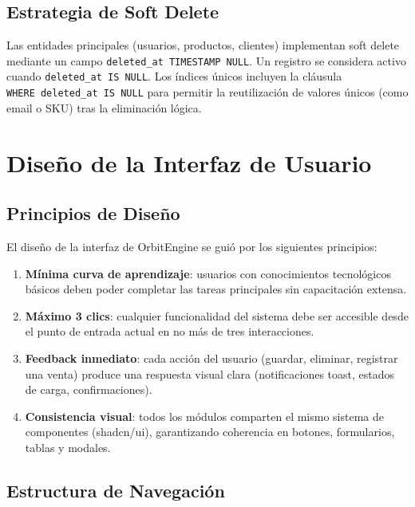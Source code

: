 \subsection{Estrategia de Soft Delete}\label{estrategia-de-soft-delete}

Las entidades principales (usuarios, productos, clientes) implementan soft delete mediante un campo \texttt{deleted\_at\ TIMESTAMP\ NULL}. Un registro se considera activo cuando \texttt{deleted\_at\ IS\ NULL}. Los índices únicos incluyen la cláusula \texttt{WHERE\ deleted\_at\ IS\ NULL} para permitir la reutilización de valores únicos (como email o SKU) tras la eliminación lógica.

\section{Diseño de la Interfaz de Usuario}\label{diseuxf1o-de-la-interfaz-de-usuario}

\subsection{Principios de Diseño}\label{principios-de-diseuxf1o}

El diseño de la interfaz de OrbitEngine se guió por los siguientes principios:

\begin{enumerate}
\def\labelenumi{\arabic{enumi}.}
\tightlist
\item
  \textbf{Mínima curva de aprendizaje}: usuarios con conocimientos tecnológicos básicos deben poder completar las tareas principales sin capacitación extensa.
\item
  \textbf{Máximo 3 clics}: cualquier funcionalidad del sistema debe ser accesible desde el punto de entrada actual en no más de tres interacciones.
\item
  \textbf{Feedback inmediato}: cada acción del usuario (guardar, eliminar, registrar una venta) produce una respuesta visual clara (notificaciones toast, estados de carga, confirmaciones).
\item
  \textbf{Consistencia visual}: todos los módulos comparten el mismo sistema de componentes (shadcn/ui), garantizando coherencia en botones, formularios, tablas y modales.
\end{enumerate}

\subsection{Estructura de Navegación}\label{estructura-de-navegaciuxf3n}

